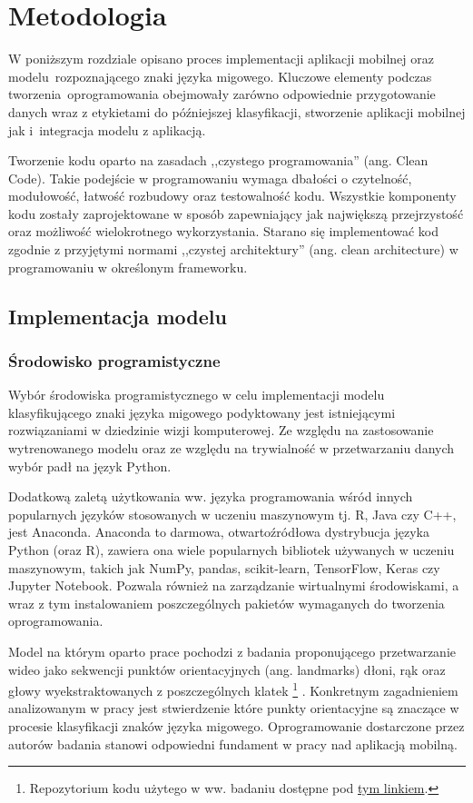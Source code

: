 

\chapter{Metodologia}
W poniższym rozdziale opisano proces implementacji aplikacji mobilnej oraz modelu~rozpoznającego znaki języka migowego. 
Kluczowe elementy podczas tworzenia~oprogramowania obejmowały zarówno odpowiednie przygotowanie danych wraz z etykietami do późniejszej klasyfikacji, stworzenie aplikacji mobilnej jak i~integracja modelu z aplikacją.

Tworzenie kodu oparto na zasadach ,,czystego programowania'' (ang. Clean Code).
Takie podejście w programowaniu wymaga dbałości o czytelność, modułowość, łatwość rozbudowy oraz testowalność kodu.
Wszystkie komponenty kodu zostały zaprojektowane w sposób zapewniający jak największą przejrzystość oraz możliwość wielokrotnego wykorzystania.
Starano się implementować kod zgodnie z przyjętymi normami ,,czystej architektury'' (ang. clean architecture) w programowaniu w określonym frameworku.

\section{Implementacja modelu}
\subsection{Środowisko programistyczne}
Wybór środowiska programistycznego w celu implementacji modelu klasyfikującego znaki języka migowego podyktowany jest istniejącymi rozwiązaniami w dziedzinie wizji komputerowej. 
Ze względu na zastosowanie wytrenowanego modelu oraz ze względu na trywialność w przetwarzaniu danych wybór padł na język Python.

Dodatkową zaletą użytkowania ww. języka programowania wśród innych popularnych języków stosowanych w uczeniu maszynowym tj. R, Java czy C++, jest Anaconda.
Anaconda to darmowa, otwartoźródłowa dystrybucja języka Python (oraz R), zawiera ona wiele popularnych bibliotek używanych w uczeniu maszynowym, takich jak NumPy, pandas, scikit-learn, TensorFlow, Keras czy Jupyter Notebook.
Pozwala również na zarządzanie wirtualnymi środowiskami, a wraz z tym instalowaniem poszczególnych pakietów wymaganych do tworzenia oprogramowania.


Model na którym oparto prace pochodzi z badania proponującego przetwarzanie wideo jako sekwencji punktów orientacyjnych (ang. landmarks) dłoni, rąk oraz głowy wyekstraktowanych z poszczególnych klatek \footnote{Repozytorium kodu użytego w ww. badaniu dostępne pod \href{https://github.com/cristinalunaj/InterpretableTransformer_SignLanguage?tab=readme-ov-file}{tym linkiem}.} \cite{10.1145/3577190.3614143}.
Konkretnym zagadnieniem analizowanym w pracy jest stwierdzenie które punkty orientacyjne są znaczące w procesie klasyfikacji znaków języka migowego.
Oprogramowanie dostarczone przez autorów badania stanowi odpowiedni fundament w pracy nad aplikacją mobilną.

